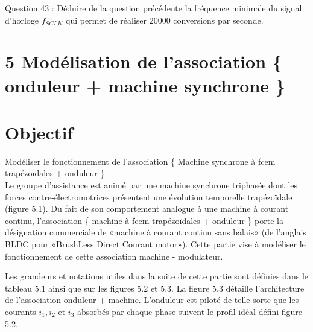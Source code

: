 \fi
{}

\ifprof
\begin{corrige}

\end{corrige}

\else
Question 43 : Déduire de la question précédente la fréquence minimale du signal d'horloge \(f_{S C L K}\) qui permet de réaliser 20000 conversions par seconde.

\section{5 Modélisation de l'association \{ onduleur + machine synchrone \}}
\section{Objectif}
Modéliser le fonctionnement de l'association \{ Machine synchrone à fcem trapézoïdales + onduleur \}.\\
Le groupe d'assistance est animé par une machine synchrone triphasée dont les forces contre-électromotrices présentent une évolution temporelle trapézoïdale (figure 5.1). Du fait de son comportement analogue à une machine à courant continu, l'association \{ machine à fcem trapézoïdales + onduleur \} porte la désignation commerciale de «machine à courant continu sans balais» (de l'anglais BLDC pour «BrushLess Direct Courant motor»). Cette partie vise à modéliser le fonctionnement de cette association machine - modulateur.

Les grandeurs et notations utiles dans la suite de cette partie sont définies dans le tableau 5.1 ainsi que sur les figures 5.2 et 5.3. La figure 5.3 détaille l'architecture de l'association onduleur + machine. L'onduleur est piloté de telle sorte que les courants \(i_{1}, i_{2}\) et \(i_{3}\) absorbés par chaque phase suivent le profil idéal défini figure 5.2.\\

